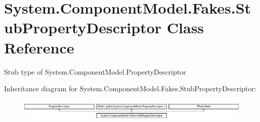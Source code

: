\hypertarget{class_system_1_1_component_model_1_1_fakes_1_1_stub_property_descriptor}{\section{System.\-Component\-Model.\-Fakes.\-Stub\-Property\-Descriptor Class Reference}
\label{class_system_1_1_component_model_1_1_fakes_1_1_stub_property_descriptor}
}


Stub type of System.\-Component\-Model.\-Property\-Descriptor 


Inheritance diagram for System.\-Component\-Model.\-Fakes.\-Stub\-Property\-Descriptor\-:\begin{figure}[H]
\begin{center}
\leavevmode
\includegraphics[height=1.025641cm]{class_system_1_1_component_model_1_1_fakes_1_1_stub_property_descriptor}
\end{center}
\end{figure}
